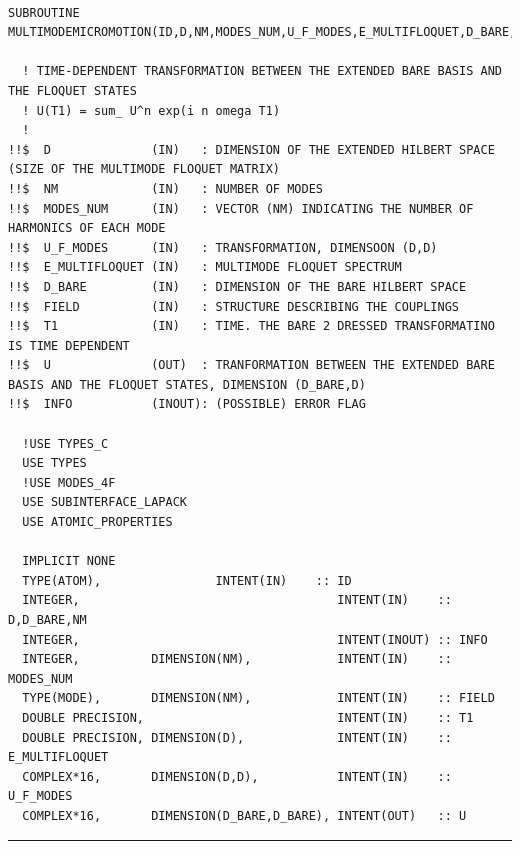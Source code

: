 \documentclass[10pt,a4paper]{article}
\begin{document}
\begin{verbatim}

SUBROUTINE MULTIMODEMICROMOTION(ID,D,NM,MODES_NUM,U_F_MODES,E_MULTIFLOQUET,D_BARE,FIELD,T1,U,INFO) 

  ! TIME-DEPENDENT TRANSFORMATION BETWEEN THE EXTENDED BARE BASIS AND THE FLOQUET STATES
  ! U(T1) = sum_ U^n exp(i n omega T1)
  ! 
!!$  D              (IN)   : DIMENSION OF THE EXTENDED HILBERT SPACE (SIZE OF THE MULTIMODE FLOQUET MATRIX)
!!$  NM             (IN)   : NUMBER OF MODES            
!!$  MODES_NUM      (IN)   : VECTOR (NM) INDICATING THE NUMBER OF HARMONICS OF EACH MODE
!!$  U_F_MODES      (IN)   : TRANSFORMATION, DIMENSOON (D,D) 
!!$  E_MULTIFLOQUET (IN)   : MULTIMODE FLOQUET SPECTRUM
!!$  D_BARE         (IN)   : DIMENSION OF THE BARE HILBERT SPACE
!!$  FIELD          (IN)   : STRUCTURE DESCRIBING THE COUPLINGS
!!$  T1             (IN)   : TIME. THE BARE 2 DRESSED TRANSFORMATINO IS TIME DEPENDENT
!!$  U              (OUT)  : TRANFORMATION BETWEEN THE EXTENDED BARE BASIS AND THE FLOQUET STATES, DIMENSION (D_BARE,D)
!!$  INFO           (INOUT): (POSSIBLE) ERROR FLAG
 
  !USE TYPES_C
  USE TYPES
  !USE MODES_4F
  USE SUBINTERFACE_LAPACK
  USE ATOMIC_PROPERTIES

  IMPLICIT NONE
  TYPE(ATOM),                INTENT(IN)    :: ID
  INTEGER,                                    INTENT(IN)    :: D,D_BARE,NM 
  INTEGER,                                    INTENT(INOUT) :: INFO
  INTEGER,          DIMENSION(NM),            INTENT(IN)    :: MODES_NUM
  TYPE(MODE),       DIMENSION(NM),            INTENT(IN)    :: FIELD  
  DOUBLE PRECISION,                           INTENT(IN)    :: T1 
  DOUBLE PRECISION, DIMENSION(D),             INTENT(IN)    :: E_MULTIFLOQUET 
  COMPLEX*16,       DIMENSION(D,D),           INTENT(IN)    :: U_F_MODES 
  COMPLEX*16,       DIMENSION(D_BARE,D_BARE), INTENT(OUT)   :: U 

\end{verbatim}
\begin{center}
\rule{12cm}{1pt}
\end{center}
\end{document}
